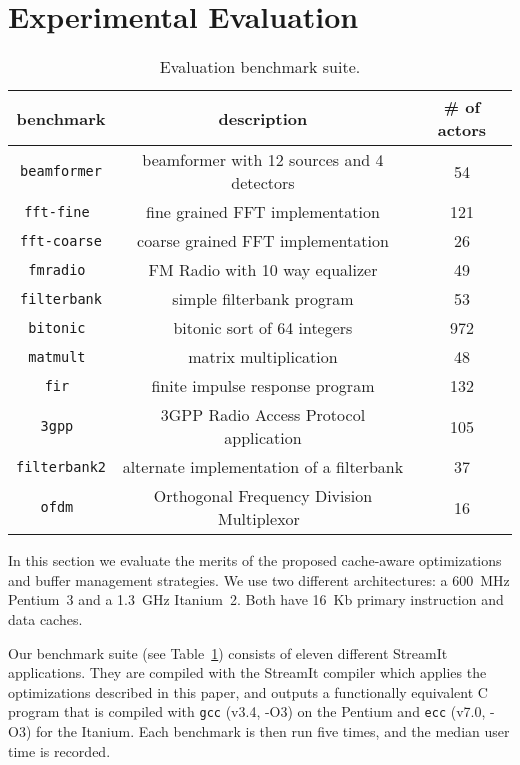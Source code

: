 \section{Experimental Evaluation}
\label{sec:evaluation}

\begin{table}[t]
\center
\label{tab:benchmarks}
\vspace{-12pt}
{\tiny
\begin{tabular}{|c|c|c|} \hline
{\bf benchmark}&{\bf description}&{\bf \# of actors}\\ \hline \hline
\texttt{beamformer} &beamformer with 12 sources and 4 detectors& 54 \\ \hline
\texttt{fft-fine	} &fine grained FFT implementation	&	121 \\ \hline
\texttt{fft-coarse} &coarse grained FFT implementation	&	26 \\ \hline
\texttt{fmradio	} &FM Radio with 10 way equalizer	&	49 \\ \hline
\texttt{filterbank} &simple filterbank program	&	53 \\ \hline
\texttt{bitonic	} &bitonic sort of 64 integers	&	972 \\ \hline
\texttt{matmult	} &matrix multiplication	&	48 \\ \hline
\texttt{fir	      } &finite impulse response program	&	132 \\ \hline
\texttt{3gpp	} &3GPP Radio Access Protocol application	&	105 \\ \hline
\texttt{filterbank2}&alternate implementation of a filterbank &	37 \\ \hline
\texttt{ofdm	 }& Orthogonal Frequency Division Multiplexor~\cite{spectrumware}	&	16 \\ \hline
\end{tabular}
}
\vspace{-12pt}
\caption{Evaluation benchmark suite.}
\end{table}


In this section we evaluate the merits of the proposed cache-aware
optimizations and buffer management strategies. We use two
different architectures: a 600~MHz Pentium~3 and a 1.3~GHz
Itanium~2. Both have 16~Kb primary instruction and data caches.

Our benchmark suite (see Table~\ref{tab:benchmarks}) consists of eleven
different StreamIt applications. They are compiled with the StreamIt
compiler which applies the optimizations described in this paper, and
outputs a functionally equivalent C program that is compiled with
\texttt{gcc} (v3.4, -O3) on the Pentium and \texttt{ecc} 
(v7.0, -O3) for the Itanium. Each benchmark is
then run five times, and the median user time is recorded.

